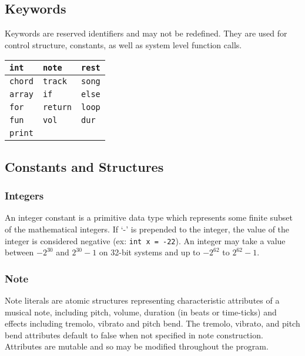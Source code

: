 \documentclass[letterpaper]{article}
\begin{document}
\begin{samepage}
\subsection{Keywords}
Keywords are reserved identifiers and may not be redefined. They are used for control structure, constants, as well as system level function calls.
\begin{table}[H]
\centering
\begin{tabularx}{.75\textwidth}{|X|X|X|}
\hline
\texttt{int} & \texttt{note} & \texttt{rest} \\
\hline
\texttt{chord} & \texttt{track} & \texttt{song} \\
\hline
\texttt{array} & \texttt{if} & \texttt{else} \\
\hline
\texttt{for} & \texttt{return} & \texttt{loop} \\
\hline
\texttt{fun} & \texttt{vol} & \texttt{dur} \\
\hline
\texttt{print} &  &  \\
\hline
\end{tabularx}
\end{table}
\end{samepage}

\subsection{Constants and Structures}
\subsubsection{Integers}
An integer constant is a primitive data type which represents some finite subset of the mathematical integers. If `-' is prepended to the integer, the value of the integer is considered negative (ex: \texttt{int x = -22}). An integer may take a value between $-2^{30}$ and $2^{30}-1$ on 32-bit systems and up to $-2^{62}$ to $2^{62}-1$.  

\subsubsection{Note}
Note literals are atomic structures representing characteristic attributes of a musical note, including pitch, volume, duration (in beats or time-ticks) and effects including tremolo, vibrato and pitch bend. The tremolo, vibrato, and pitch bend attributes default to false when not specified in note construction. Attributes are mutable and so may be modified throughout the program. 
\end{document}
